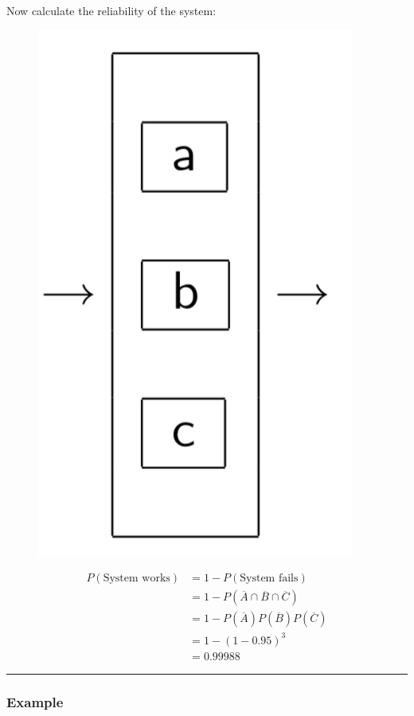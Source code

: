 \documentclass{report}
\newcommand{\ex}{\noindent\rule{\linewidth}{0.2pt}}
\begin{document}
Now calculate the reliability of the system:
\begin{figure}[ht!]
\centering
\includegraphics[scale=0.5]{Parallel.png}
\end{figure}
\begin{align*}P(\text{System works}) & = 1- P(\text{System fails}) \\
& = 1 - P(\overline{A} \cap \overline{B} \cap \overline{C}) \\
& = 1 - P(\overline{A})P( \overline{B} )P( \overline{C}) \\
& = 1 - (1-0.95)^3 \\
& = 0.99988 
\end{align*}

\ex

\subsubsection*{Example}
\end{document}
